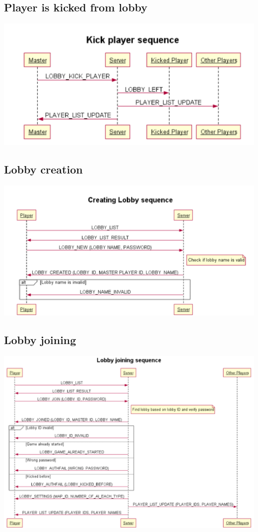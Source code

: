 \documentclass[12pt]{article}
\begin{document}
\subsection*{Player is kicked from lobby}
\includegraphics[scale=0.5]{kick_player_sequence}
\subsection*{Lobby creation}
\includegraphics[scale=0.5]{lobby-creation-sequence}
\subsection*{Lobby joining}
\includegraphics[scale=0.3]{lobby-join-sequence}
\end{document}
